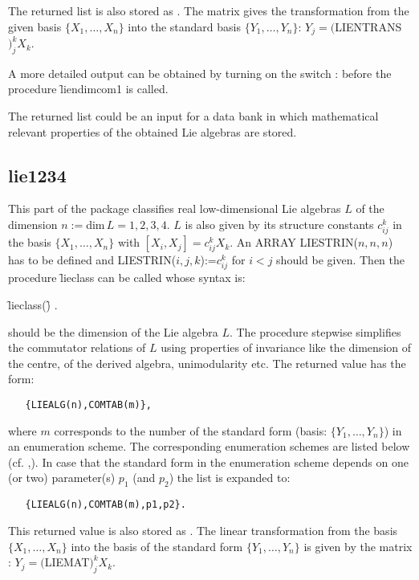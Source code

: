\hypertarget{reserved:LIE_LIST}{}
\hypertarget{reserved:LIENTRANS}{}
The returned list is also stored as . The matrix  gives the
transformation from the given basis $\{X_1,\ldots ,X_n\}$ into the standard
basis $\{Y_1,\ldots ,Y_n\}$: $Y_j=($LIENTRANS$)_j^k X_k$.

A more detailed output can be obtained by turning on the switch :
\hypertarget{switch:TR_LIE}{}
before the procedure \f{liendimcom1} is called.

The returned list could be an input for a data bank in which mathematical
relevant properties of the obtained Lie algebras are stored.

\subsection{lie1234}

This part of the package classifies real low-dimensional Lie algebras $L$
of the dimension
$n:=$dim$\,L=1,2,3,4$. $L$ is also given by its structure constants $c_{ij}^k$
in the basis $\{X_1,\ldots,X_n\}$ with $[X_i,X_j]=c_{ij}^k X_k$. An ARRAY
LIESTRIN($n,n,n$) has to be defined and LIESTRIN($i,j,k$):=$c_{ij}^k$ for
$i<j$ should be given. Then the procedure \f{lieclass} can be called
whose syntax is:
\hypertarget{procedure:LIECLASS}{}
\begin{syntax}
   \f{lieclass(}\f{)} .
\end{syntax}
 should be the dimension of the Lie algebra $L$. The procedure
stepwise simplifies the commutator relations of $L$ using properties of
invariance like the dimension of the centre, of the derived algebra,
unimodularity etc.  The returned value has the form:
\begin{verbatim}
   {LIEALG(n),COMTAB(m)},
\end{verbatim}
where $m$ corresponds to the number of the standard form (basis:
$\{Y_1,\ldots,Y_n\}$) in an enumeration scheme. The corresponding enumeration
schemes are listed below (cf. \cite{Schoebel:92},\cite{MacCallum:99}).
In case that the standard form in the enumeration scheme depends on one (or two)
parameter(s) $p_1$ (and $p_2$) the list is expanded to:
\begin{verbatim}
   {LIEALG(n),COMTAB(m),p1,p2}.
\end{verbatim}
\hypertarget{reserved:LIE_CLASS}{}
\hypertarget{reserved:LIEMAT}{}
This returned value is also stored as . The linear transformation from
the basis $\{X_1,\ldots,X_n\}$ into the basis of the standard form
$\{Y_1,\ldots,Y_n\}$ is given by the matrix :
$Y_j=($LIEMAT$)_j^k X_k$.

